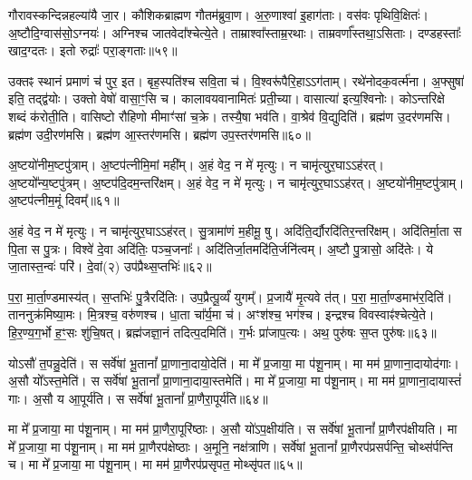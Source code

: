 गौरावस्कन्दिन्नहल्या॑यै जा॒र। कौशिकब्राह्मण गौतम॑ब्रुवा॒ण। 
अ॒रु॒णाश्वा॑ इ॒हाग॑ताः। वस॑वः पृथिवि॒क्षितः॑। 
अ॒ष्टौदि॒ग्वास॑सो॒\-ऽग्नयः॑। अग्निश्च जात\-वेदा᳚श्चेत्ये॒ते। 
ताम्राश्वा᳚स्ताम्र॒रथाः। ताम्रवर्णा᳚स्तथा॒\-ऽसिताः। 
दण्डहस्ताः᳚ खाद॒ग्दतः। इतो रुद्राः᳚ परा॒ङ्गताः॥५९॥\ip


उक्तꣴ स्थानं प्रमाणं च॑ पुर॒ इत। बृह॒स्पति॑श्च सवि॒ता च॑। 
वि॒श्वरू॑पैरि॒हा\-ऽऽग॑ताम्। रथे॑नोदक॒वर्त्म॑ना। 
अ॒फ्सुषा॑ इति॒ तद्द्व॑योः। उक्तो वेषो॑ वासा॒ꣳ॒सि च। 
कालावयवानामितः॑ प्रती॒च्या। वासात्या॑ इत्य॒श्विनोः। 
को\-ऽन्तरिक्षे शब्दं क॑रोती॒ति। वासिष्टो रौहिणो मीमाꣳ॑सां च॒क्रे। 
तस्यै॒षा भव॑ति। वा॒श्रेव॑ वि॒द्युदिति॑। 
ब्रह्म॑ण उ॒दर॑णमसि। ब्रह्म॑ण उदी॒रण॑मसि। 
ब्रह्म॑ण आ॒स्तर॑णमसि। ब्रह्म॑ण उप॒स्तर॑णमसि॥६०॥\ip\anuvakamend


\noindent [अप॑क्रामत गर्भि॒ण्यः॑]

अ॒ष्टयो॑नीम॒ष्टपु॑त्राम्। अ॒ष्टप॑त्नीमि॒मां मही᳚म्। 
अ॒हं वेद॒ न मे॑ मृत्युः। न चामृ॑त्युर॒घा\-ऽऽह॑रत्। 
अ॒ष्टयो᳚न्य॒ष्टपु॑त्रम्। अ॒ष्टप॑दि॒दम॒न्तरि॑क्षम्। 
अ॒हं वेद॒ न मे॑ मृत्युः। न चामृ॑त्युर॒घा\-ऽऽह॑रत्। 
अ॒ष्टयो॑नीम॒ष्टपु॑त्राम्। अ॒ष्टप॑त्नीम॒मूं दिवम्‌᳚॥६१॥\ip


अ॒हं वेद॒ न मे॑ मृत्युः। न चामृ॑त्युर॒घा\-ऽऽह॑रत्। 
सु॒त्रामा॑णं म॒हीमू॒ षु। अदि॑ति॒र्द्यौरदि॑तिर॒न्तरि॑क्षम्। 
अदि॑तिर्मा॒ता स पि॒ता स पु॒त्रः। विश्वे॑ दे॒वा अदि॑तिः॒ पञ्च\-॒जनाः᳚। 
अदि॑तिर्जा॒तमदि॑ति॒र्जनि॑त्वम्। अ॒ष्टौ पु॒त्रासो॒ अदि॑तेः। 
ये जा॒तास्त॒न्वः॑ परि॑। दे॒वां(२) उप॑प्रैथ्स॒प्तभिः॑॥६२॥\ip


प॒रा॒ मा॒र्ता॒ण्डमास्य॑त्। स॒प्तभिः॑ पु॒त्रैरदि॑तिः। 
उप॒प्रैत्पू॒र्व्यं॑ युगम्᳚। प्र॒जायै॑ मृ॒त्यवे त॑त्। 
प॒रा॒ मा॒र्ता॒ण्डमाभ॑र॒दिति॑। ताननुक्र॑मिष्या॒मः। 
मि॒त्रश्च॒ वरु॑णश्च। धा॒ता चा᳚र्य॒मा च॑। 
अꣳश॑श्च॒ भग॑श्च। इन्द्रश्च विवस्वाꣴ॑श्चेत्ये॒ते। 
हि॒र॒ण्य॒ग॒र्भो ह॒ꣳ॒सः शु॑चि॒षत्। 
ब्रह्म॑जज्ञा॒नं तदित्प॒दमिति॑। ग॒र्भः प्रा॑जाप॒त्यः। 
अथ॒ पुरु॑षः स॒प्त पुरु॑षः॥६३॥\ip

\noindent[य॒था॒स्था॒नं ग॑र्भि॒ण्यः॑]\anuvakamend

यो\-ऽसौ॑ त॒पन्नु॒देति॑। स सर्वे॑षां भू॒तानां᳚ प्रा॒णाना॒दायो॒देति॑। 
मा मे᳚ प्र॒जाया॒ मा प॑शू॒नाम्। मा मम॑ प्रा॒णाना॒दायोद॑गाः। 
अ॒सौ यो᳚\-ऽस्त॒मेति॑। स सर्वे॑षां भू॒तानां᳚ प्रा॒णाना॒दाया॒स्तमेति॑। 
मा मे᳚ प्र॒जाया॒ मा प॑शू॒नाम्। मा मम॑ प्रा॒णाना॒दायास्तं॑ गाः। 
अ॒सौ य आ॒पूर्य॑ति। स सर्वे॑षां भू॒तानां᳚ प्रा॒णैरा॒पूर्य॑ति॥६४॥\ip


मा मे᳚ प्र॒जाया॒ मा प॑शू॒नाम्। मा मम॑ प्रा॒णैरा॒पूरि॑ष्ठाः। 
अ॒सौ यो॑\-ऽप॒क्षीय॑ति। स सर्वे॑षां भू॒तानां᳚ प्रा॒णैरप॑क्षीयति। 
मा मे᳚ प्र॒जाया॒ मा प॑शू॒नाम्। मा मम॑ प्रा॒णैरप॑क्षेष्ठाः। 
अ॒मूनि॒ नक्ष॑त्राणि। सर्वे॑षां भू॒तानां᳚ प्रा॒णैरप॑प्रसर्पन्ति॒ चोथ्स॑र्पन्ति च। 
मा मे᳚ प्र॒जाया॒ मा प॑शू॒नाम्। मा मम॑ प्रा॒णैरप॑प्रसृपत॒ मोथ्सृ॑पत॥६५॥\ip


